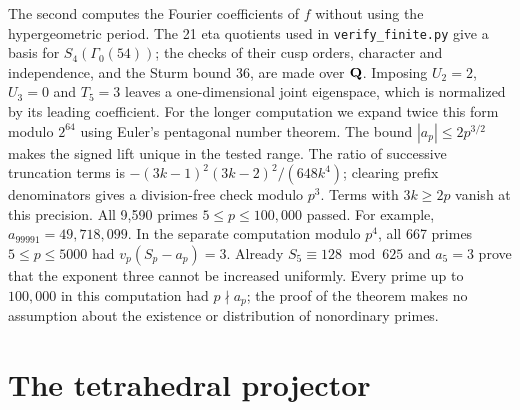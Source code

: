 \documentclass[11pt,letterpaper]{article}
\theoremstyle{definition}
\theoremstyle{remark}
\newcommand{\paperanchors}[1]{%
 \renewcommand{\theHsection}{#1.\arabic{section}}%
 \renewcommand{\theHsubsection}{\theHsection.\arabic{subsection}}%
 \renewcommand{\theHequation}{#1.\arabic{equation}}%
 \renewcommand{\theHtable}{#1.\arabic{table}}%
 \renewcommand{\theHtheorem}{\theHsection.\arabic{theorem}}}
\begin{document}
The second computes the Fourier coefficients of $f$ without using
the hypergeometric period. The 21 eta quotients used in
\texttt{verify\_finite.py} give a basis for $S_4(\Gamma_0(54))$;
the checks of their cusp orders, character and independence, and the
Sturm bound 36, are made over $\mathbf Q$. Imposing $U_2=2$, $U_3=0$ and
$T_5=3$ leaves a one-dimensional joint eigenspace, which is normalized
by its leading coefficient. For the longer computation we expand twice
this form modulo $2^{64}$ using Euler's pentagonal number theorem.
The bound $|a_p|\le2p^{3/2}$ makes the signed lift unique in the
tested range. The ratio of successive truncation terms is
$-(3k-1)^2(3k-2)^2/(648k^4)$; clearing prefix denominators gives a
division-free check modulo $p^3$. Terms with $3k\ge2p$ vanish at
this precision.
All 9,590 primes $5\le p\le100{,}000$ passed. For example,
$a_{99991}=49{,}718{,}099$. In the separate computation modulo $p^4$,
all 667 primes $5\le p\le5000$ had $v_p(S_p-a_p)=3$.
Already $S_5\equiv128\bmod625$ and $a_5=3$ prove that the exponent
three cannot be increased uniformly. Every prime up to $100{,}000$
in this computation had $p\nmid a_p$; the proof of the theorem makes
no assumption about the existence or distribution of nonordinary primes.

\appendix\paperanchors{IV.app}
\section{The tetrahedral projector}\label{IV:app:tetra}
\end{document}
